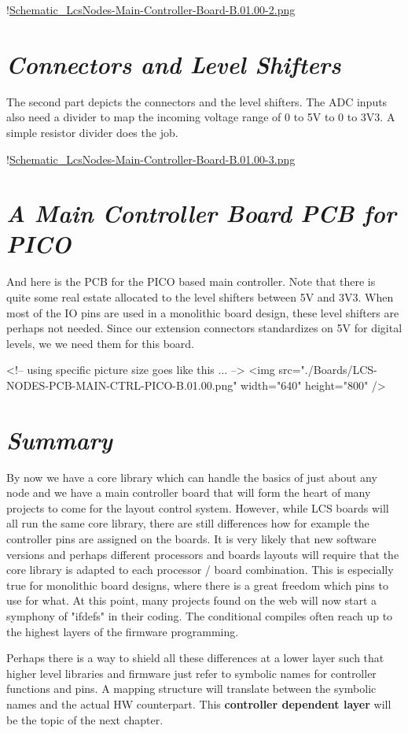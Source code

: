 !\href{./Schematics/Schematic_LcsNodes-Main-Controller-Board-B.01.00-2.png }{Schematic_LcsNodes-Main-Controller-Board-B.01.00-2.png}

\section{\textit{Connectors and Level Shifters}}

The second part depicts the connectors and the level shifters. The ADC inputs also need a divider to map the incoming voltage range of 0 to 5V to 0 to 3V3. A simple resistor divider does the job.

!\href{./Schematics/Schematic_LcsNodes-Main-Controller-Board-B.01.00-3.png }{Schematic_LcsNodes-Main-Controller-Board-B.01.00-3.png}

\section{\textit{A Main Controller Board PCB for PICO}}

And here is the PCB for the PICO based main controller. Note that there is quite some real estate allocated to the level shifters between 5V and 3V3. When most of the IO pins are used in a monolithic board design, these level shifters are perhaps not needed. Since our extension connectors standardizes on 5V for digital levels, we we need them for this board.

<!-- using specific picture size goes like this ... -->
<img src="./Boards/LCS-NODES-PCB-MAIN-CTRL-PICO-B.01.00.png" width="640" height="800" />


\section{\textit{Summary}}

By now we have a core library which can handle the basics of just about any node and we have a main controller board that will form the heart of many projects to come for the layout control system. However, while LCS boards will all run the same core library, there are still differences how for example the controller pins are assigned on the boards. It is very likely that new software versions and perhaps different processors and boards layouts will require that the core library is adapted to each processor / board combination. This is especially true for monolithic board designs, where there is a great freedom which pins to use for what. At this point, many projects found on the web will now start a symphony of "ifdefs" in their coding. The conditional compiles often reach up to the highest layers of the firmware programming. 

Perhaps there is a way to shield all these differences at a lower layer such that higher level libraries and firmware just refer to symbolic names for controller functions and pins. A mapping structure will translate between the symbolic names and the actual HW counterpart. This \textbf{controller dependent layer} will be the topic of the next chapter.
